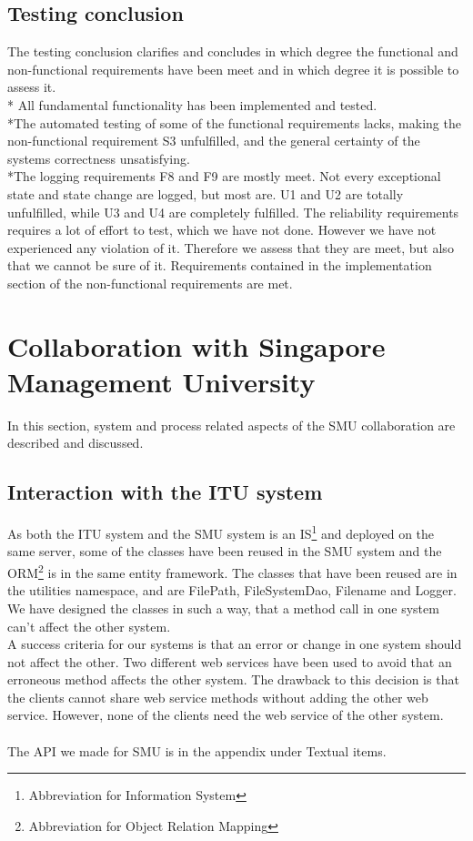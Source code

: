 \documentclass[a4paper,11pt,report]{article}
\begin{document}
\subsection{Testing conclusion}
The testing conclusion clarifies and concludes in which degree the functional and non-functional requirements have been meet and in which degree it is possible to assess it. \\*
All fundamental functionality has been implemented and tested. \\*The automated testing of some of the functional requirements lacks, making the non-functional requirement S3 unfulfilled, and the general certainty of the systems correctness unsatisfying.\\*The logging requirements F8 and F9 are mostly meet. Not every exceptional state and state change are logged, but most are. U1 and U2 are totally unfulfilled, while U3 and U4 are completely fulfilled. The reliability requirements requires a lot of effort to test, which we have not done. However we have not experienced any violation of it. Therefore we assess that they are meet, but also that we cannot be sure of it. Requirements contained in the implementation section of the non-functional requirements are met.

\newpage
\section{Collaboration with Singapore Management University}

In this section, system and process related aspects of the SMU collaboration are described and discussed.

\subsection{Interaction with the ITU system}
As both the ITU system and the SMU system is an IS\footnote[2]{Abbreviation for Information System} and deployed on the same server, some of the classes have been reused in the SMU system and the ORM\footnote[3]{Abbreviation for Object Relation Mapping} is in the same entity framework.
The classes that have been reused are in the utilities namespace, and are FilePath, FileSystemDao, Filename and Logger. We have designed the classes in such a way, that a method call in one system can't affect the other system. \\
A success criteria for our systems is that an error or change in one system should not affect the other. Two different web services have been used to avoid that an erroneous method affects the other system.
The drawback to this decision is that the clients cannot share web service methods without adding the other web service. However, none of the clients need the web service of the other system. \\ \\
The API we made for SMU is in the appendix under Textual items.
\end{document}
